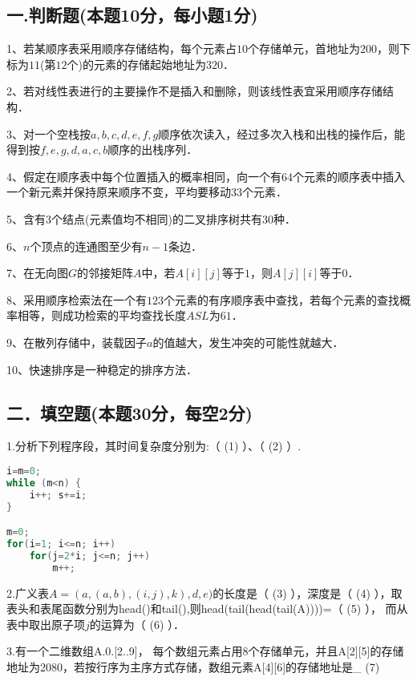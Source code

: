 
\subsection{一.判断题(本题10分，每小题1分)}

1、若某顺序表采用顺序存储结构，每个元素占$10$个存储单元，首地址为$200$，则下标为$11$(第$12$个)的元素的存储起始地址为$320$．

2、若对线性表进行的主要操作不是插入和删除，则该线性表宜采用顺序存储结构．

3、对一个空栈按$a,b,c,d,e,f,g$顺序依次读入，经过多次入栈和出栈的操作后，能得到按$f,e,g,d,a,c,b$顺序的出栈序列．

4、假定在顺序表中每个位置插入的概率相同，向一个有$64$个元素的顺序表中插入一个新元素并保持原来顺序不变，平均要移动$33$个元素．

5、含有$3$个结点(元素值均不相同)的二叉排序树共有$30$种．

6、$n$个顶点的连通图至少有$n-1$条边．

7、在无向图$G$的邻接矩阵$A$中，若$A[i][j]$等于$1$，则$A[j][i]$等于$0$．

8、采用顺序检索法在一个有$123$个元素的有序顺序表中查找，若每个元素的查找概率相等，则成功检索的平均查找长度$ASL$为$61$．

9、在散列存储中，装载因子$a$的值越大，发生冲突的可能性就越大．

10、快速排序是一种稳定的排序方法．

\subsection{二．填空题(本题30分，每空2分)}

1.分析下列程序段，其时间复杂度分别为:（ (1) ）、（ (2) ）.
\begin{lstlisting}[language=cpp]
i=m=0;
while (m<n) {
    i++; s+=i;
}

m=0;
for(i=1; i<=n; i++)
    for(j=2*i; j<=n; j++)
        m++;
\end{lstlisting}

2.广义表$A=(a, (a, b), (i,j),k),d,e)$的长度是（ (3) ），深度是（ (4) ），取表头和表尾函数分别为head()和tail(),则head(tail(head(tail(A))))=（ (5) ）， 而从表中取出原子项$j$的运算为（ (6) ）．

3.有一个二维数组A.0.[2..9]， 每个数组元素占用8个存储单元，并且A[2][5]的存储地址为2080，若按行序为主序方式存储，数组元素A[4][6]的存储地址是_ (7)

